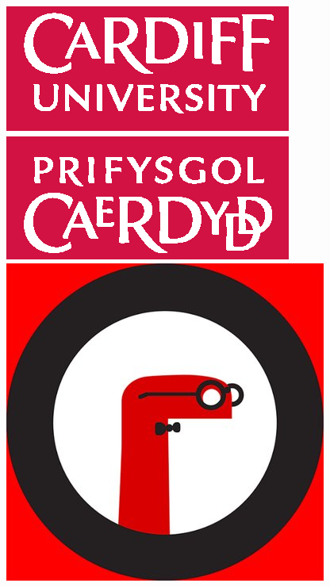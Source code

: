 \documentclass{beamer}
\begin{document}
    \begin{frame}
        \centering

        \includegraphics[height=.4\textheight]{static/CUident_CMYK.eps}
        \hfill
        \includegraphics[height=.4\textheight]{static/pyconuk.jpg}

        \vspace{.1\textheight}


\end{frame}
\end{document}
